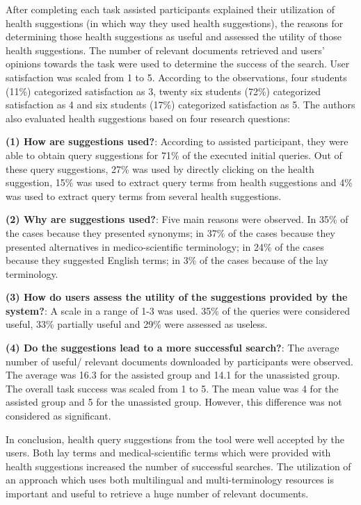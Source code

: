 \documentclass[]{article}
\begin{document}
After completing each task assisted participants explained their utilization of health suggestions (in which way they used health suggestions), the reasons for determining those health suggestions as useful  and assessed the utility of those health suggestions. The number of relevant documents retrieved and users' opinions towards the task were used to determine the success of the search. User satisfaction was scaled from 1 to 5. According to the observations, four students (11\%) categorized satisfaction as 3, twenty six students (72\%) categorized satisfaction as 4 and six students (17\%) categorized satisfaction as 5. The authors also evaluated health suggestions based on four research questions:

\textbf{(1) How are suggestions used?}: According to assisted participant, they were able to obtain query suggestions for 71\% of the executed initial queries. Out of these query suggestions, 27\% was used by directly clicking on the health suggestion, 15\% was used to extract query terms from health suggestions and 4\% was used to extract query terms from several health suggestions.           

\textbf{(2) Why are suggestions used?}: Five main reasons were observed. In 35\% of the cases because they presented synonyms; in 37\% of the cases because they presented alternatives in medico-scientific terminology; in 24\% of the cases because they suggested English terms; in 3\% of the cases because of the lay terminology. 

\textbf{(3) How do users assess the utility of the suggestions provided by the system?}: A scale in a range of 1-3 was used. 35\% of the queries were considered useful, 33\% partially useful and 29\% were assessed as useless.   

\textbf{(4) Do the suggestions lead to a more successful search?}: The average number of useful/ relevant documents downloaded by participants were observed. The average was 16.3 for the assisted group and 14.1 for the unassisted group. The overall task success was scaled from 1 to 5. The mean value was 4 for the assisted group and 5 for the unassisted group. However, this difference was not considered as significant.   

In conclusion, health query suggestions from the tool were well accepted by the users. Both lay terms and medical-scientific terms which were provided with health suggestions increased the number of successful searches. The utilization of an approach which uses both multilingual and multi-terminology resources is important and useful to retrieve a huge number of relevant documents.     
\end{document}
